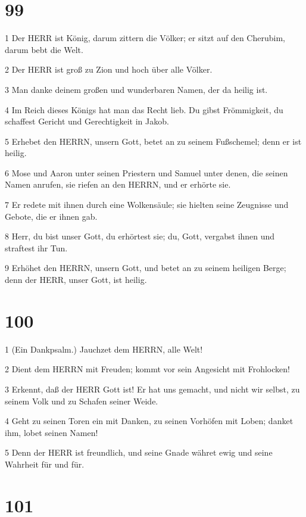 \chapter{99}

\par 1 Der HERR ist König, darum zittern die Völker; er sitzt auf den Cherubim, darum bebt die Welt.
\par 2 Der HERR ist groß zu Zion und hoch über alle Völker.
\par 3 Man danke deinem großen und wunderbaren Namen, der da heilig ist.
\par 4 Im Reich dieses Königs hat man das Recht lieb. Du gibst Frömmigkeit, du schaffest Gericht und Gerechtigkeit in Jakob.
\par 5 Erhebet den HERRN, unsern Gott, betet an zu seinem Fußschemel; denn er ist heilig.
\par 6 Mose und Aaron unter seinen Priestern und Samuel unter denen, die seinen Namen anrufen, sie riefen an den HERRN, und er erhörte sie.
\par 7 Er redete mit ihnen durch eine Wolkensäule; sie hielten seine Zeugnisse und Gebote, die er ihnen gab.
\par 8 Herr, du bist unser Gott, du erhörtest sie; du, Gott, vergabst ihnen und straftest ihr Tun.
\par 9 Erhöhet den HERRN, unsern Gott, und betet an zu seinem heiligen Berge; denn der HERR, unser Gott, ist heilig.

\chapter{100}

\par 1 (Ein Dankpsalm.) Jauchzet dem HERRN, alle Welt!
\par 2 Dient dem HERRN mit Freuden; kommt vor sein Angesicht mit Frohlocken!
\par 3 Erkennt, daß der HERR Gott ist! Er hat uns gemacht, und nicht wir selbst, zu seinem Volk und zu Schafen seiner Weide.
\par 4 Geht zu seinen Toren ein mit Danken, zu seinen Vorhöfen mit Loben; danket ihm, lobet seinen Namen!
\par 5 Denn der HERR ist freundlich, und seine Gnade währet ewig und seine Wahrheit für und für.

\chapter{101}

